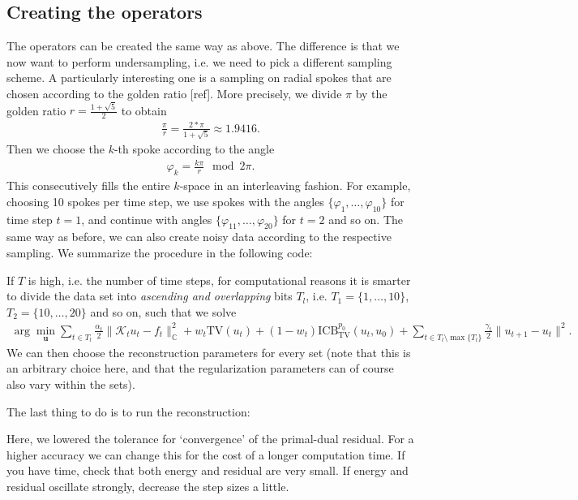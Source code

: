 \documentclass{article}
\newcommand{\TV}{\mathrm{TV}}
\newcommand{\C}{\mathbb{C}}
\newcommand{\ICBTV}{\mathrm{ICB}_\TV}
\newcommand{\ubold}{\mathbf{u}}
\newcommand{\Kcal}{\mathcal{K}}
\begin{document}
\subsection{Creating the operators}
The operators can be created the same way as above. 
The difference is that we now want to perform undersampling, i.e. we need to pick a different sampling scheme. 
A particularly interesting one is a sampling on radial spokes that are chosen according to the golden ratio [ref]. 
More precisely, we divide $\pi$ by the golden ratio $r = \frac{1 + \sqrt{5}}{2}$ to obtain 
\begin{align*}
 \frac{\pi}{r}  = \frac{2 * \pi}{1 + \sqrt{5}} \approx 1.9416.
\end{align*}
Then we choose the $k$-th spoke according to the angle 
\begin{align*}
 \varphi_k = \frac{k \pi}{r} \mod 2 \pi.
\end{align*}
This consecutively fills the entire $k$-space in an interleaving fashion.
For example, choosing 10 spokes per time step, we use spokes with the angles $\{\varphi_1, \dots, \varphi_{10} \}$ for time step $t=1$, and continue with angles $\{\varphi_{11}, \dots, \varphi_{20} \}$ for $t = 2$ and so on.
The same way as before, we can also create noisy data according to the respective sampling. 
We summarize the procedure in the following code: 

%
If $T$ is high, i.e. the number of time steps, for computational reasons it is smarter to divide the data set into {\it ascending and overlapping} bits $T_l$, i.e. $T_1 = \{1,\dots,10\}$, $T_2 = \{10,\dots,20\}$ and so on, such that we solve 
\begin{align}
   \arg \min_{\ubold} \sum_{t\in T_l} \frac{\alpha_t}{2} \| \Kcal_t u_t - f_t\|_\C^2 + w_t \TV(u_t) + (1-w_t) \ICBTV^{p_0}(u_t, u_0 ) + \sum_{t\in T_l \setminus \max\{T_l\}} \frac{\gamma_t}{2} \| u_{t+1} - u_t \|^2.
   \label{eq:jr_fmri_bits}
\end{align}
We can then choose the reconstruction parameters for every set (note that this is an arbitrary choice here, and that the regularization parameters can of course also vary within the sets).


The last thing to do is to run the reconstruction: 

%
Here, we lowered the tolerance for `convergence' of the primal-dual residual. 
For a higher accuracy we can change this for the cost of a longer computation time.
If you have time, check that both energy and residual are very small. 
If energy and residual oscillate strongly, decrease the step sizes a little.
\end{document}
